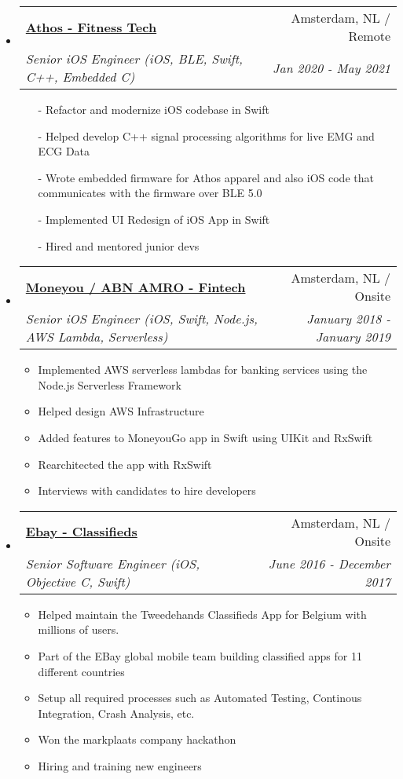 \documentclass[letterpaper,11pt]{article}
\makeatletter
\newcommand{\resitem}[1]{\item #1 \vspace{-2pt}}
\newcommand{\ressubheading}[4]{
\begin{tabular*}{7.0in}{l@{\extracolsep{\fill}}r}
    \textbf{#1} & #2 \\
    \textit{#3} & \textit{#4} \\
\end{tabular*}\vspace{-6pt}}
\makeatother
\begin{document}
\begin{itemize}
\item
    \ressubheading{\href{https://www.crunchbase.com/organization/athos}{Athos - Fitness Tech\texttt{}}}{Amsterdam, NL / Remote}{Senior iOS Engineer (iOS, BLE, Swift, C++, Embedded C)}{Jan 2020 - May 2021}
    \begin{itemize}
        \item[-]{Refactor and modernize iOS codebase in Swift}
        \item[-]{Helped develop C++ signal processing algorithms for live EMG and ECG Data}
        \item[-]{Wrote embedded firmware for Athos apparel and also iOS code that communicates with the firmware over BLE 5.0}
        \item[-]{Implemented UI Redesign of iOS App in Swift}
        \item[-]{Hired and mentored junior devs}
    \end{itemize}
    
\item
    \ressubheading{\href{https://www.moneyou.nl/}{Moneyou / ABN AMRO - Fintech }}{Amsterdam, NL / Onsite}{Senior iOS Engineer (iOS, Swift, Node.js, AWS Lambda, Serverless)}{January 2018 - January 2019}
    \begin{itemize}
        \resitem{Implemented AWS serverless lambdas for banking services using the Node.js Serverless Framework}
        \resitem{Helped design AWS Infrastructure}
        \resitem{Added features to MoneyouGo app in Swift using UIKit and RxSwift}
        \resitem{Rearchitected the app with RxSwift}
        \resitem{Interviews with candidates to hire developers}
    \end{itemize}
        
\item
    \ressubheading{\href{https://www.markplaats.nl/}{Ebay - Classifieds}}{Amsterdam, NL / Onsite}{Senior Software Engineer (iOS, Objective C, Swift)}{June 2016 - December 2017}
    \begin{itemize}
        \resitem{Helped maintain the Tweedehands Classifieds App for Belgium with millions of users.}
        \resitem{Part of the EBay global mobile team building classified apps for 11 different countries}
        \resitem{Setup all required processes such as Automated Testing, Continous Integration, Crash Analysis, etc.}
        \resitem{Won the markplaats company hackathon}
        \resitem{Hiring and training new engineers}
    \end{itemize}
 

\end{itemize}
\end{document}
